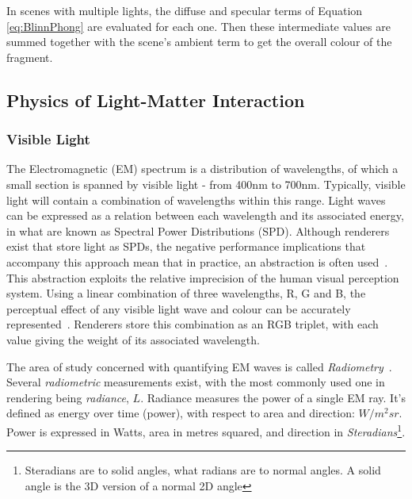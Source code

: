 In scenes with multiple lights, the diffuse and specular terms of Equation \ref{eq:BlinnPhong} are evaluated for each one. Then these intermediate values are summed together with the scene's ambient term to get the overall colour of the fragment.

\subsection{Physics of Light-Matter Interaction} \label{PhysicsOfLightMatterInteraction}

\subsubsection{Visible Light}

The Electromagnetic (EM) spectrum is a distribution of wavelengths, of which a small section is spanned by visible light - from 400nm to 700nm. Typically, visible light will contain a combination of wavelengths within this range. Light waves can be expressed as a relation between each wavelength and its associated energy, in what are known as Spectral Power Distributions (SPD). Although renderers exist that store light as SPDs, the negative performance implications that accompany this approach mean that in practice, an abstraction is often used~\cite{SpectralRendering}. This abstraction exploits the relative imprecision of the human visual perception system. Using a linear combination of three wavelengths, R, G and B, the perceptual effect of any visible light wave and colour can be accurately represented~\cite{RGBColours}. Renderers store this combination as an RGB triplet, with each value giving the weight of its associated wavelength.

The area of study concerned with quantifying EM waves is called \textit{Radiometry}~\cite{IntroToRadiometry}. Several \textit{radiometric} measurements exist, with the most commonly used one in rendering being \textit{radiance}, \begin{math}L\end{math}. Radiance measures the power of a single EM ray. It's defined as energy over time (power), with respect to area and direction: \begin{math}W/m^2sr\end{math}. Power is expressed in Watts, area in metres squared, and direction in \textit{Steradians}\footnote{Steradians are to solid angles, what radians are to normal angles. A solid angle is the 3D version of a normal 2D angle}.

